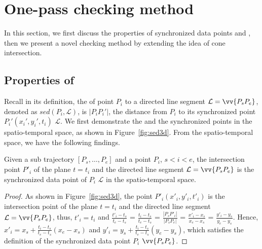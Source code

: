 \section{One-pass \sed checking method}

In this section, we first discuss the properties of synchronized data points and \sed, then we present a novel \sed checking method by extending the idea of cone intersection.



\subsection{Properties of \sed} %
Recall in its definition, the \sed of point $P_i$ to a directed line segment $\mathcal{L} = \vv{P_{s}P_{e}}$, denoted as $sed(P_i, \mathcal{L})$, is $|P_iP_i'|$, the distance from $P_i$ to its synchronized point $P_i' (x_i', y_i', t_i)$ \wrt $\mathcal{L}$.
We first demonstrate the \sed and the synchronized points in the spatio-temporal space, as shown in Figure~\ref{fig:sed3d}.
From the spatio-temporal space, we have the following findings.





\begin{lemma}
\label{prop-3d-syn-point}
Given a sub trajectory $[P_s, \ldots, P_e]$ and a point $P_i$, $s<i<e$, the intersection point $P'_i$ of the plane $t=t_i$ and the directed line segment $\mathcal{L} = \vv{P_sP_e}$ is the synchronized data point of $P_i$ \wrt $\mathcal{L}$ in the spatio-temporal space.
\end{lemma}

\begin{proof}
As shown in Figure~\ref{fig:sed3d}, the point $P'_i (x'_i, y'_i, t'_i)$ is the intersection point of the plane $t=t_i$ and the directed line segment $\mathcal{L} = \vv{P_sP_e}$, thus, $t'_i = t_i$ and $\frac{t'_i - t_s}{t_e - t_s}$ = $\frac{t_i - t_s}{t_e - t_s}$  = $\frac{|P_sP'_i|}{|P_sP_e|}$ = $\frac{x'_i - x_s}{x_e - x_s}$ = $\frac{y'_i - y_s}{y_e - y_s}$. Hence, $x'_i = x_s +  \frac{t_i-t_s}{t_e - t_s}(x_e - x_s)$ and $y'_i = y_s +  \frac{t_i - t_s}{t_e - t_s}(y_e - y_s)$, which satisfies the definition of the synchronized data point $P_i$ \wrt $\vv{P_sP_e}$.
\end{proof}




